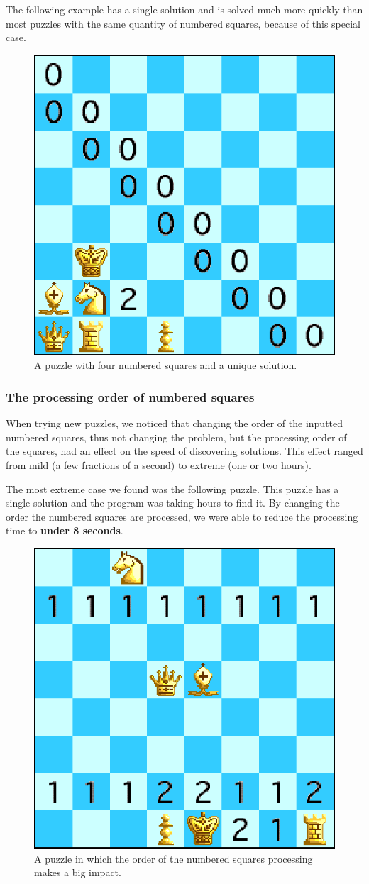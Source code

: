 \documentclass[runningheads]{llncs}
\begin{document}
The following example has a single solution and is solved much more quickly
than most puzzles with the same quantity of numbered squares, because of this
special case.

\begin{figure}[H]
  \centering
  \includegraphics[width=0.4\linewidth]{figures/chess8.eps}
  \caption{A puzzle with four numbered squares and a unique solution.}\label{fig:fig6}
\end{figure}

\subsubsection{The processing order of numbered squares}
When trying new puzzles, we noticed that changing the order of the inputted
numbered squares, thus not changing the problem, but the processing order
of the squares, had an effect on the speed of discovering solutions. This
effect ranged from mild (a few fractions of a second) to extreme (one or two
hours).

The most extreme case we found was the following puzzle. This puzzle has a single
solution and the program was taking hours to find it. By changing the order
the numbered squares are processed, we were able to reduce the processing time
to \textbf{under 8 seconds}.

\begin{figure}[H]
  \centering
  \includegraphics[width=0.4\linewidth]{figures/chess7.eps}
  \caption{A puzzle in which the order of the numbered squares processing makes a big impact.}\label{fig:fig7}
\end{figure}
\end{document}
